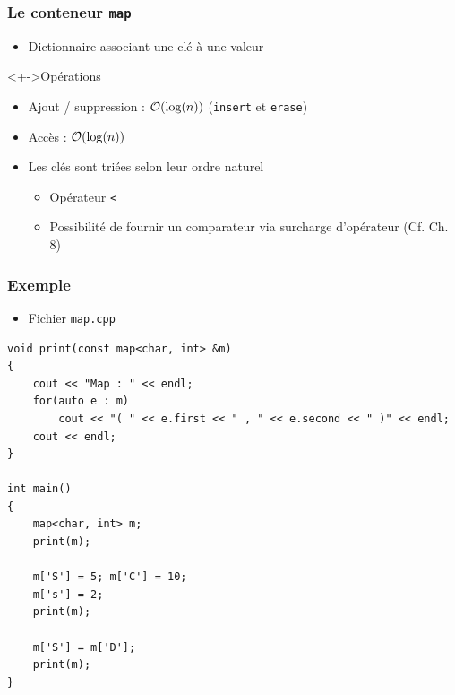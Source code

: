 \begin{frame}
\frametitle{Le conteneur \texttt{map}}
\begin{itemize}[<+->]
\item Dictionnaire associant une clé à une valeur
\end{itemize}
\begin{exampleblock}<+->{Opérations}
	\begin{itemize}[<+->]
	\item Ajout / suppression : ${\mathcal{O}}(\log(n))$ (\texttt{insert} et \texttt{erase})
	\item Accès : ${\mathcal{O}}(\log(n))$
	\end{itemize}
\end{exampleblock}
\begin{itemize}[<+->]
\item Les clés sont triées selon leur ordre naturel
	\begin{itemize}
	\item Opérateur \texttt{<}
	\item Possibilité de fournir un comparateur via surcharge d'opérateur (Cf. Ch. 8)
	\end{itemize}
\end{itemize}
\end{frame}

\begin{frame}[containsverbatim]
\frametitle{Exemple}
\begin{itemize}
\item Fichier \texttt{map.cpp}
\end{itemize}
\begin{lstlisting}
void print(const map<char, int> &m)
{
	cout << "Map : " << endl;
	for(auto e : m)
		cout << "( " << e.first << " , " << e.second << " )" << endl;
	cout << endl;
}

int main()
{
	map<char, int> m;
	print(m);

	m['S'] = 5; m['C'] = 10;
	m['s'] = 2;
	print(m);

	m['S'] = m['D'];
	print(m);
}
\end{lstlisting}
\end{frame}

